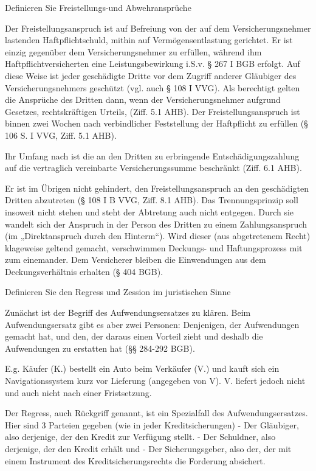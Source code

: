 Definieren Sie Freistellungs-und Abwehransprüche

Der Freistellungsanspruch ist auf Befreiung von der auf dem Versicherungsnehmer lastenden Haftpflichtschuld, 
mithin auf Vermögensentlastung gerichtet. 
Er ist einzig gegenüber dem Versicherungsnehmer zu erfüllen, während ihm Haftpflichtversicherten eine Leistungsbewirkung i.S.v. § 267 I BGB erfolgt. 
Auf diese Weise ist jeder geschädigte Dritte vor dem Zugriff anderer Gläubiger des Versicherungsnehmers geschützt (vgl. auch § 108 I VVG). 
Als berechtigt gelten die Ansprüche des Dritten dann, wenn der Versicherungsnehmer aufgrund Gesetzes, rechtskräftigen Urteils, (Ziff. 5.1 AHB). 
Der Freistellungsanspruch ist binnen zwei Wochen nach verbindlicher Feststellung der Haftpflicht zu erfüllen (§ 106 S. I VVG, Ziff. 5.1 AHB).

Ihr Umfang nach ist die an den Dritten zu erbringende Entschädigungszahlung auf die vertraglich vereinbarte Versicherungssumme beschränkt 
(Ziff. 6.1 AHB). 

Er ist im Übrigen nicht gehindert, den Freistellungsanspruch an den geschädigten Dritten abzutreten (§ 108 I B VVG, Ziff. 8.1 AHB). 
Das Trennungsprinzip soll insoweit nicht stehen und steht der Abtretung auch nicht entgegen. 
Durch sie wandelt sich der Anspruch in der Person des Dritten zu einem Zahlungsanspruch (im „Direktanspruch durch den Hinterm“). 
Wird dieser (aus abgetretenem Recht) klageweise geltend gemacht, verschwimmen Deckungs- und Haftungsprozess mit zum einemander. 
Dem Versicherer bleiben die Einwendungen aus dem Deckungsverhältnis erhalten (§ 404 BGB).


Definieren Sie den Regress und Zession im juristischen Sinne

Zunächst ist der Begriff des Aufwendungsersatzes zu klären.
Beim Aufwendungsersatz gibt es aber zwei Personen: Denjenigen, der Aufwendungen gemacht hat, und den, 
der daraus einen Vorteil zieht und deshalb die Aufwendungen zu erstatten hat (§§ 284-292 BGB).

E.g. Käufer (K.) bestellt ein Auto beim Verkäufer (V.) und kauft sich ein Navigationssystem kurz vor Lieferung (angegeben von V).
V. liefert jedoch nicht und auch nicht nach einer Fristsetzung.

Der Regress, auch Rückgriff genannt, ist ein Spezialfall des Aufwendungsersatzes. 
Hier sind 3 Parteien gegeben (wie in jeder Kreditsicherungen)
- Der Gläubiger, also derjenige, der den Kredit zur Verfügung stellt.
- Der Schuldner, also derjenige, der den Kredit erhält und
- Der Sicherungsgeber, also der, der mit einem Instrument des Kreditsicherungsrechts die Forderung absichert.

